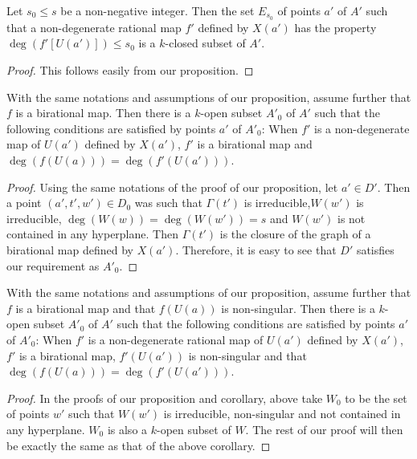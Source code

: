 \setcounter{corollary}{0}
\begin{corollary}\label{art14-app-coro1}
Let $s_{0}\leq s$ be a non-negative integer. Then the set $E_{s_{0}}$ of points $a'$ of $A'$ such that a non-degenerate rational map $f'$ defined by $X(a')$ has the property $\deg(f'[U(a')])\leq s_{0}$ is a $k$-closed subset of $A'$.
\end{corollary}

\begin{proof}
This follows easily from our proposition.
\end{proof}

\begin{corollary}\label{art14-app-coro2}
With the same notations and assumptions of our proposition, assume further that $f$ is a birational map. Then there is a $k$-open subset $A'_{0}$ of $A'$ such that the following conditions are satisfied by points $a'$ of $A'_{0}$: When $f'$ is a non-degenerate map of $U(a')$ defined by $X(a')$, $f'$ is a birational map and $\deg(f(U(a)))=\deg (f'(U(a')))$.
\end{corollary}

\begin{proof}
Using the same notations of the proof of our proposition, let $a'\in D'$. Then a point $(a',t',w')\in D_{0}$ was such that $\Gamma(t')$ is irreducible,\pageoriginale $W(w')$ is irreducible, $\deg(W(w))=\deg(W(w'))=s$ and $W(w')$ is not contained in any hyperplane. Then $\Gamma(t')$ is the closure of the graph of a birational map defined by $X(a')$. Therefore, it is easy to see that $D'$ satisfies our requirement as $A'_{0}$.
\end{proof}

\begin{corollary}\label{art14-app-coro3}
With the same notations and assumptions of our proposition, assume further that $f$ is a birational map and that $f(U(a))$ is non-singular. Then there is a $k$-open subset $A'_{0}$ of $A'$ such that the following conditions are satisfied by points $a'$ of $A'_{0}$: When $f'$ is a non-degenerate rational map of $U(a')$ defined by $X(a')$, $f'$ is a birational map, $f'(U(a'))$ is non-singular and that $\deg(f(U(a)))=\deg (f'(U(a')))$.
\end{corollary}

\begin{proof}
In the proofs of our proposition and corollary, above take $W_{0}$ to be the set of points $w'$ such that $W(w')$ is irreducible, non-singular and not contained in any hyperplane. $W_{0}$ is also a $k$-open subset of $W$. The rest of our proof will then be exactly the same as that of the above corollary.
\end{proof}

